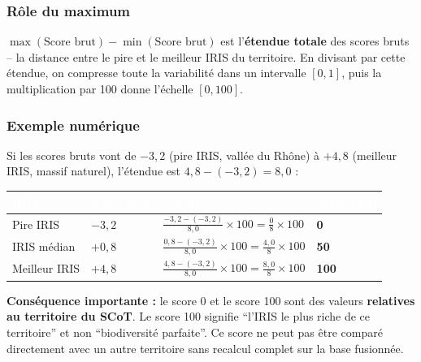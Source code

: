 \documentclass[11pt,a4paper]{report}
\begin{document}
\subsubsection*{Rôle du maximum}

$\max(\text{Score brut}) - \min(\text{Score brut})$ est l'\textbf{étendue totale} des scores bruts -- la distance entre le pire et le meilleur IRIS du territoire. En divisant par cette étendue, on compresse toute la variabilité dans un intervalle $[0, 1]$, puis la multiplication par 100 donne l'échelle $[0, 100]$.

\subsubsection*{Exemple numérique}

Si les scores bruts vont de $-3{,}2$ (pire IRIS, vallée du Rhône) à $+4{,}8$ (meilleur IRIS, massif naturel), l'étendue est $4{,}8 - (-3{,}2) = 8{,}0$ :

\vspace{0.3cm}
\begin{tabularx}{\textwidth}{L{2.5cm} L{1.8cm} X L{2cm}}
  \toprule
  \textcolor{white}{\textbf{IRIS}} &
  \textcolor{white}{\textbf{Score brut}} &
  \textcolor{white}{\textbf{Calcul}} &
  \textcolor{white}{\textbf{Score final}} \\
  \midrule
  Pire IRIS & $-3{,}2$ & $\frac{-3{,}2 - (-3{,}2)}{8{,}0} \times 100 = \frac{0}{8} \times 100$ & \textbf{0} \\
  IRIS médian & $+0{,}8$ & $\frac{0{,}8 - (-3{,}2)}{8{,}0} \times 100 = \frac{4{,}0}{8} \times 100$ & \textbf{50} \\
  Meilleur IRIS & $+4{,}8$ & $\frac{4{,}8 - (-3{,}2)}{8{,}0} \times 100 = \frac{8{,}0}{8} \times 100$ & \textbf{100} \\
  \bottomrule
\end{tabularx}

\vspace{0.4cm}
\begin{tcolorbox}[infobox]
  \textbf{Conséquence importante :} le score 0 et le score 100 sont des valeurs \textbf{relatives au territoire du SCoT}. Le score 100 signifie ``l'IRIS le plus riche de ce territoire'' et non ``biodiversité parfaite''. Ce score ne peut pas être comparé directement avec un autre territoire sans recalcul complet sur la base fusionnée.
\end{tcolorbox}

\end{document}

